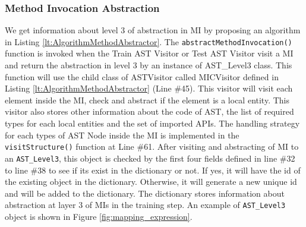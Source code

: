 \subsubsection{Method Invocation Abstraction}
We get information about level 3 of abstraction in MI by proposing an algorithm in Listing \ref{lt:AlgorithmMethodAbstractor}. The \texttt{abstractMethodInvocation()} function is invoked when the Train AST Visitor or Test AST Visitor visit a MI and return the abstraction in level 3 by an instance of AST\_Level3 class. This function will use the child class of ASTVisitor called MICVisitor defined in Listing \ref{lt:AlgorithmMethodAbstractor} (Line \#45). This visitor will visit each element inside the MI, check and abstract if the element is a local entity. This visitor also stores other information about the code of AST, the list of required types for each local entities and the set of imported APIs. The handling strategy for each types of AST Node inside the MI is implemented in the \texttt{visitStructure()} function at Line \#61. After visiting and abstracting of MI to an \texttt{AST\_Level3}, this object is checked by the first four fields defined in line \#32 to line \#38 to see if its exist in the dictionary or not. If yes, it will have the id of the existing object in the dictionary. Otherwise, it will generate a new unique id and will be added to the dictionary. The dictionary stores information about abstraction at layer 3 of MIs in the training step. An example of  \texttt{AST\_Level3} object is shown in Figure \ref{fig:mapping_expression}.

